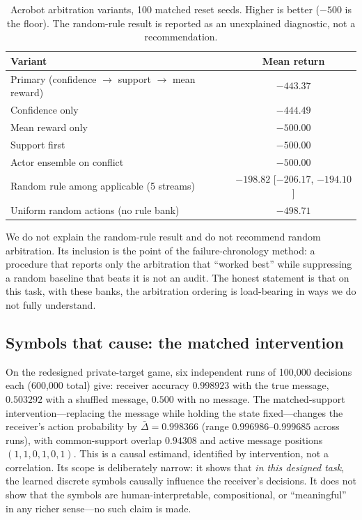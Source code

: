 \documentclass[11pt]{article}
\begin{document}
\begin{table}[t]
\centering
\caption{Acrobot arbitration variants, 100 matched reset seeds. Higher is better ($-500$ is the floor). The random-rule result is reported as an unexplained diagnostic, not a recommendation.}
\label{tab:arbitration}
\begin{tabular}{lc}
\toprule
Variant & Mean return \\
\midrule
Primary (confidence $\to$ support $\to$ mean reward) & $-443.37$ \\
Confidence only & $-444.49$ \\
Mean reward only & $-500.00$ \\
Support first & $-500.00$ \\
Actor ensemble on conflict & $-500.00$ \\
Random rule among applicable (5 streams) & $-198.82$ [$-206.17$, $-194.10$] \\
Uniform random actions (no rule bank) & $-498.71$ \\
\bottomrule
\end{tabular}
\end{table}

We do not explain the random-rule result and do not recommend random arbitration. Its inclusion is the point of the failure-chronology method: a procedure that reports only the arbitration that ``worked best'' while suppressing a random baseline that beats it is not an audit. The honest statement is that on this task, with these banks, the arbitration ordering is load-bearing in ways we do not fully understand.

\subsection{Symbols that cause: the matched intervention}

On the redesigned private-target game, six independent runs of 100,000 decisions each (600,000 total) give: receiver accuracy $0.998923$ with the true message, $0.503292$ with a shuffled message, $0.500$ with no message. The matched-support intervention---replacing the message while holding the state fixed---changes the receiver's action probability by $\bar{\Delta} = 0.998366$ (range $0.996986$--$0.999685$ across runs), with common-support overlap $0.94308$ and active message positions $(1,1,0,1,0,1)$. This is a causal estimand, identified by intervention, not a correlation. Its scope is deliberately narrow: it shows that \textit{in this designed task}, the learned discrete symbols causally influence the receiver's decisions. It does not show that the symbols are human-interpretable, compositional, or ``meaningful'' in any richer sense---no such claim is made.
\end{document}
